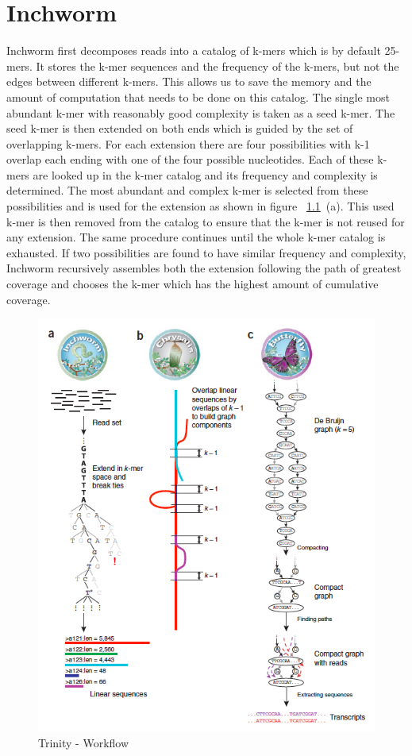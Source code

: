 \label{key}\documentclass[bachinf, english ,zihtitle,final,hyperref,utf8]{zihpub}
\begin{document}
\chapter{Inchworm}
Inchworm first decomposes reads into a catalog of k-mers which is by default 25-mers. It stores the k-mer sequences and the frequency of the k-mers, but not the edges between different k-mers. This allows us to save the memory and the amount of computation that needs to be done on this catalog. The single most abundant k-mer with reasonably good complexity is taken as a seed k-mer. The seed k-mer is then extended on both ends which is guided by the set of overlapping k-mers. For each extension there are four possibilities with k-1 overlap each ending with one of the four possible nucleotides. Each of these k-mers are looked up in the k-mer catalog and its frequency and complexity is determined. The most abundant and complex k-mer is selected from these possibilities and is used for the extension as shown in figure ~\ref{trinity}~(a). This used k-mer is then removed from the catalog to ensure that the k-mer is not reused for any extension. The same procedure continues until the whole k-mer catalog is exhausted. If two possibilities are found to have similar frequency and complexity, Inchworm recursively assembles both the extension following the path of greatest coverage and chooses the k-mer which has the highest amount of cumulative coverage.
\begin{figure}[h]
\center
\includegraphics[scale=0.5]{Trinity_phases}
\caption{Trinity - Workflow}
\label{trinity}
\end{figure} 
\end{document}
